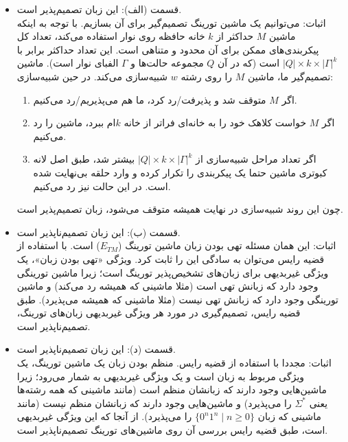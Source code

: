 \begin{itemize}
    \item {قسمت (الف):} این زبان {تصمیم‌پذیر } است.
    \\
    {اثبات:} می‌توانیم یک ماشین تورینگ تصمیم‌گیر برای آن بسازیم. با توجه به اینکه ماشین $M$ حداکثر از $k$ خانه حافظه روی نوار استفاده می‌کند، تعداد کل پیکربندی‌های ممکن برای آن محدود و متناهی است. این تعداد حداکثر برابر با $|Q| \times k \times |\Gamma|^k$ است (که در آن $Q$ مجموعه حالت‌ها و $\Gamma$ الفبای نوار است). 
    ماشین تصمیم‌گیر ما، ماشین $M$ را روی رشته $w$ شبیه‌سازی می‌کند. در حین شبیه‌سازی:
    \begin{enumerate}
        \item اگر $M$ متوقف شد و پذیرفت/رد کرد، ما هم می‌پذیریم/رد می‌کنیم.
        \item اگر $M$ خواست کلاهک خود را به خانه‌ای فراتر از خانه $k$ام ببرد، ماشین را رد می‌کنیم.
        \item اگر تعداد مراحل شبیه‌سازی از $|Q| \times k \times |\Gamma|^k$ بیشتر شد، طبق اصل لانه کبوتری ماشین حتما یک پیکربندی را تکرار کرده و وارد حلقه بی‌نهایت شده است. در این حالت نیز رد می‌کنیم.
    \end{enumerate}
    چون این روند شبیه‌سازی در نهایت همیشه متوقف می‌شود، زبان تصمیم‌پذیر است.

    \item {قسمت (ب):} این زبان {تصمیم‌ناپذیر } است.
    \\
    {اثبات:} این همان مسئله تهی بودن زبان ماشین تورینگ ($E_{TM}$) است. با استفاده از {قضیه رایس} می‌توان به سادگی این را ثابت کرد. ویژگی «تهی بودن زبان»، یک ویژگی غیربدیهی برای زبان‌های تشخیص‌پذیر تورینگ است؛ زیرا ماشین تورینگی وجود دارد که زبانش تهی است (مثلا ماشینی که همیشه رد می‌کند) و ماشین تورینگی وجود دارد که زبانش تهی نیست (مثلا ماشینی که همیشه می‌پذیرد). طبق قضیه رایس، تصمیم‌گیری در مورد هر ویژگی غیربدیهی زبان‌های تورینگ، تصمیم‌ناپذیر است.

    \item {قسمت (د):} این زبان {تصمیم‌ناپذیر } است.
    \\
    {اثبات:} مجددا با استفاده از {قضیه رایس}. منظم بودن زبان یک ماشین تورینگ، یک ویژگی مربوط به زبان است و یک ویژگی غیربدیهی به شمار می‌رود؛ زیرا ماشین‌هایی وجود دارند که زبانشان منظم است (مانند ماشینی که همه رشته‌ها یعنی $\Sigma^*$ را می‌پذیرد) و ماشین‌هایی وجود دارند که زبانشان منظم نیست (مانند ماشینی که زبان $\{0^n1^n \mid n \ge 0\}$ را می‌پذیرد). از آنجا که این ویژگی غیربدیهی است، طبق قضیه رایس بررسی آن روی ماشین‌های تورینگ تصمیم‌ناپذیر است.


\end{itemize}
